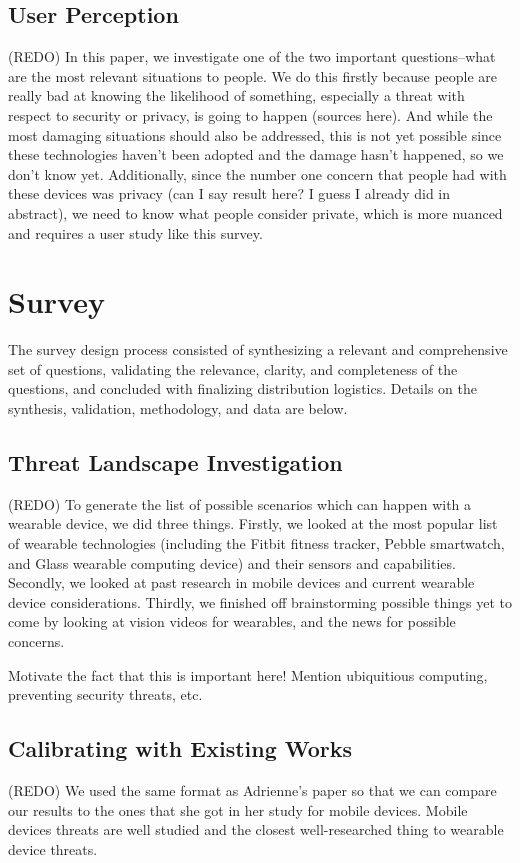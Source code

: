 \documentclass{acm_proc_article-sp}
\begin{document}
\subsection{User Perception}
(REDO) In this paper, we investigate one of the two important questions--what are the most relevant situations to people. We do this firstly because people are really bad at knowing the likelihood of something, especially a threat with respect to security or privacy, is going to happen (sources here). And while the most damaging situations should also be addressed, this is not yet possible since these technologies haven't been adopted and the damage hasn't happened, so we don't know yet. Additionally, since the number one concern that people had with these devices was privacy (can I say result here? I guess I already did in abstract), we need to know what people consider private, which is more nuanced and requires a user study like this survey. 


\section{Survey}
The survey design process consisted of synthesizing a relevant and comprehensive set of questions, validating the relevance, clarity, and completeness of the questions, and concluded with finalizing distribution logistics. Details on the synthesis, validation, methodology, and data are below.

\subsection{Threat Landscape Investigation} 
(REDO) To generate the list of possible scenarios which can happen with a wearable device, we did three things. Firstly, we looked at the most popular list of wearable technologies (including the Fitbit fitness tracker, Pebble smartwatch, and Glass wearable computing device) and their sensors and capabilities. Secondly, we looked at past research in mobile devices and current wearable device considerations. Thirdly, we finished off brainstorming possible things yet to come by looking at vision videos for wearables, and the news for possible concerns. 

Motivate the fact that this is important here! Mention ubiquitious computing, preventing security threats, etc. 

\subsection{Calibrating with Existing Works}
(REDO) We used the same format as Adrienne's paper so that we can compare our results to the ones that she got in her study for mobile devices. Mobile devices threats are well studied and the closest well-researched thing to wearable device threats. 
\end{document}
